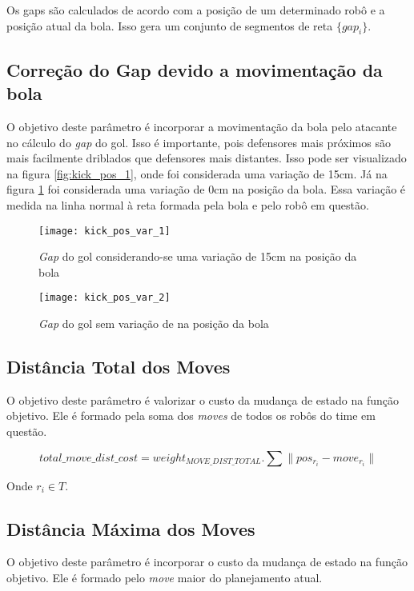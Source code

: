 Os gaps são calculados de acordo com a posição de um determinado robô
e a posição atual da bola. Isso gera um conjunto de segmentos de reta
$\lbrace gap_i \rbrace$.

\subsection{Correção do Gap devido a movimentação da bola} 
O objetivo deste parâmetro é incorporar a movimentação
da bola pelo atacante no cálculo do \textit{gap} do gol. Isso é importante,
pois defensores mais
próximos são mais facilmente driblados que defensores mais distantes. Isso
pode ser visualizado na figura \ref{fig:kick_pos_1}, onde foi considerada
uma variação de 15cm. Já na figura \ref{fig:kick_pos_2} foi considerada uma
variação de 0cm na posição da bola. Essa variação é medida na linha normal
à reta formada pela bola e pelo robô em questão.


\begin{figure}[h]
  \centering
  \texttt{[image: kick\_pos\_var\_1]}
  \caption{\textit{Gap} do gol considerando-se uma variação de 15cm na 
           posição da bola}\label{fig:kick_pos_1}
  \texttt{[image: kick\_pos\_var\_2]}
  \caption{\textit{Gap} do gol sem variação de na posição da
           bola}\label{fig:kick_pos_2}
\end{figure}


\subsection{Distância Total dos Moves} 
O objetivo deste parâmetro é valorizar o custo da
mudança de estado na função objetivo. Ele é formado pela soma dos
\textit{moves} de todos os robôs do time em questão.

\begin{dmath} 
 total{\_}move{\_}dist{\_}cost = weight_{MOVE{\_}DIST{\_}TOTAL} . 
 \sum \lVert pos_{r_i} - move_{r_i}\rVert
\end{dmath} 

Onde $r_i \in T$.

\subsection{Distância Máxima dos Moves} 
O objetivo deste parâmetro é incorporar o custo da
mudança de estado na função objetivo. Ele é formado pelo \textit{move}
maior do planejamento atual.

